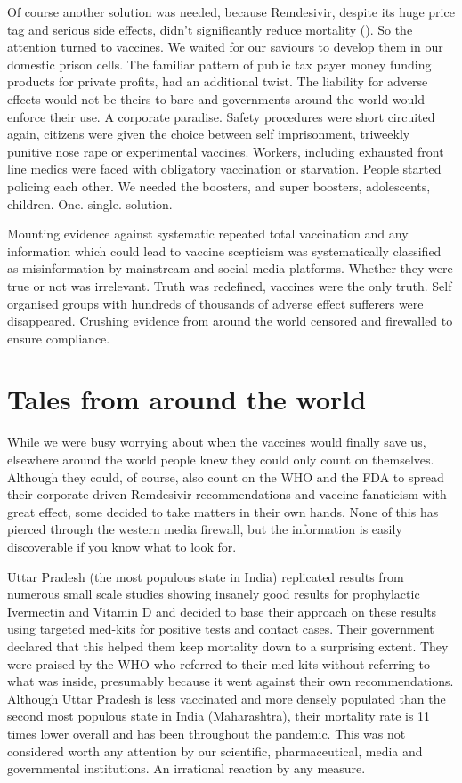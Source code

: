 \documentclass[11pt,a4paper]{article}
\begin{document}
Of course another solution was needed, because Remdesivir, despite its huge price tag and serious side effects, didn’t significantly reduce mortality (\cite{Ader21}). So the attention turned to vaccines. We waited for our saviours to develop them in our domestic prison cells. The familiar pattern of public tax payer money funding products for private profits, had an additional twist. The liability for adverse effects would not be theirs to bare and governments around the world would enforce their use. A corporate paradise. Safety procedures were short circuited again, citizens were given the choice between self imprisonment, triweekly punitive nose rape or experimental vaccines. Workers, including exhausted front line medics were faced with obligatory vaccination or starvation. People started policing each other. We needed the boosters, and super boosters, adolescents, children. One. single. solution.

Mounting evidence against systematic repeated total vaccination and any information which could lead to vaccine scepticism was systematically classified as misinformation by mainstream and social media platforms. Whether they were true or not was irrelevant. Truth was redefined, vaccines were the only truth. Self organised groups with hundreds of thousands of adverse effect sufferers were disappeared. Crushing evidence from around the world censored and firewalled to ensure compliance. 

\section*{Tales from around the world}

While we were busy worrying about when the vaccines would finally save us, elsewhere around the world people knew they could only count on themselves. Although they could, of course, also count on the WHO and the FDA to spread their corporate driven Remdesivir recommendations and vaccine fanaticism with great effect, some decided to take matters in their own hands. None of this has pierced through the western media firewall, but the information is easily discoverable if you know what to look for.

Uttar Pradesh (the most populous state in India) replicated results from numerous small scale studies showing insanely good results for prophylactic Ivermectin and Vitamin D and decided to base their approach on these results using targeted med-kits for positive tests and contact cases. Their government declared that this helped them keep mortality down to a surprising extent. They were praised by the WHO who referred to their med-kits without referring to what was inside, presumably because it went against their own recommendations. Although Uttar Pradesh is less vaccinated and more densely populated than the second most populous state in India (Maharashtra), their mortality rate is 11 times lower overall and has been throughout the pandemic. This was not considered worth any attention by our scientific, pharmaceutical, media and governmental institutions. An irrational reaction by any measure.
\end{document}
